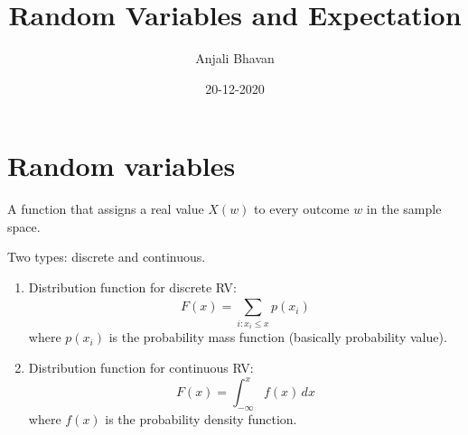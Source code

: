 \documentclass{article}
\title{Random Variables and Expectation}
\date{20-12-2020}
\author{Anjali Bhavan}
\begin{document}
\maketitle

\section{Random variables}
\begin{definition}
    A function that assigns a real value $ X(w) $ to every outcome $ w $ in the sample space.
\end{definition}
Two types: discrete and continuous. 
\begin{enumerate}
  \item Distribution function for discrete RV: 
  \begin{equation*}
  F(x) = \sum_{i:x_{i} \leq x}^{} p(x_{i})
  \end{equation*}
  where $ p(x_{i}) $ is the probability mass function (basically probability value).
  \item Distribution function for continuous RV:
  \begin{equation*}
  F(x) = \int_{-\infty}^{x} f(x) \,dx 
  \end{equation*}
  where $ f(x) $ is the probability density function.
\end{enumerate}
\end{document}
